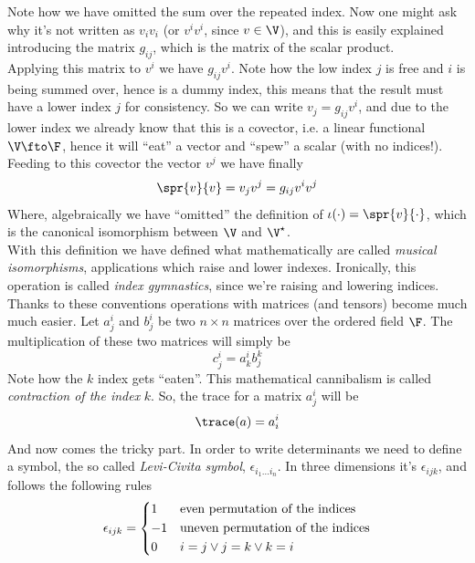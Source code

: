 \documentclass[../mmf.tex]{subfiles}
\begin{document}
Note how we have omitted the sum over the repeated index. Now one might ask why it's not written as $v_iv_i$ (or $v^iv^i$, since $v\in\V$), and this is easily explained introducing the matrix $g_{ij}$, which is the matrix of the scalar product.\\
Applying this matrix to $v^i$ we have $g_{ij}v^i$. Note how the low index $j$ is free and $i$ is being summed over, hence is a dummy index, this means that the result must have a lower index $j$ for consistency. So we can write $v_j=g_{ij}v^i$, and due to the lower index we already know that this is a covector, i.e. a linear functional $\V\fto\F$, hence it will ``eat'' a vector and ``spew'' a scalar (with no indices!). Feeding to this covector the vector $v^j$ we have finally
\begin{equation}
	\spr{v}{v}=v_jv^j=g_{ij}v^iv^j
	\label{eq:dotproducteinsteinnot}
\end{equation}
Where, algebraically we have ``omitted'' the definition of $\iota(\cdot)=\spr{v}{\cdot}$, which is the canonical isomorphism between $\V$ and $\V^\star$.\\
With this definition we have defined what mathematically are called \textit{musical isomorphisms}, applications which raise and lower indexes. Ironically, this operation is called \textit{index gymnastics}, since we're raising and lowering indices.
Thanks to these conventions operations with matrices (and tensors) become much much easier. Let $a^i_j$ and $b^i_j$ be two $n\times n$ matrices over the ordered field $\F$. The multiplication of these two matrices will simply be
\begin{equation}
	c^i_j=a^i_kb^k_j
	\label{eq:matrixprodein}
\end{equation}
Note how the $k$ index gets ``eaten''. This mathematical cannibalism is called \textit{contraction of the index} $k$. So, the trace for a matrix $a^i_j$ will be
\begin{equation}
	\trace(a)=a^i_i
	\label{eq:traceeinnot}
\end{equation}
And now comes the tricky part. In order to write determinants we need to define a symbol, the so called \textit{Levi-Civita symbol}, $\epsilon_{i_1\ldots i_n}$. In three dimensions it's $\epsilon_{ijk}$, and follows the following rules
\begin{equation}
	\epsilon_{ijk}=\begin{dcases}1&\text{even permutation of the indices}\\-1&\text{uneven permutation of the indices}\\0&i=j\vee j=k\vee k=i\end{dcases}
	\label{eq:3dlc}
\end{equation}
\end{document}
